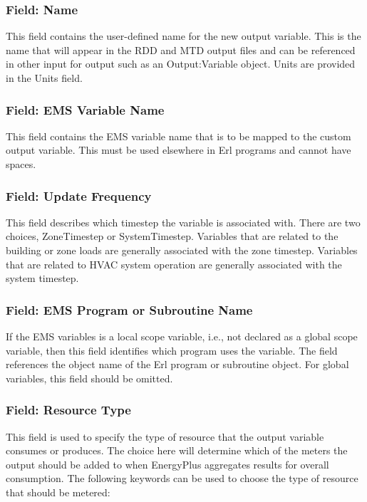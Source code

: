 \subsubsection{Field: Name}\label{field-name-6-006}

This field contains the user-defined name for the new output variable. This is the name that will appear in the RDD and MTD output files and can be referenced in other input for output such as an Output:Variable object. Units are provided in the Units field.

\subsubsection{Field: EMS Variable Name}\label{field-ems-variable-name-1}

This field contains the EMS variable name that is to be mapped to the custom output variable. This must be used elsewhere in Erl programs and cannot have spaces.

\subsubsection{Field: Update Frequency}\label{field-update-frequency-1}

This field describes which timestep the variable is associated with. There are two choices, ZoneTimestep or SystemTimestep. Variables that are related to the building or zone loads are generally associated with the zone timestep. Variables that are related to HVAC system operation are generally associated with the system timestep.

\subsubsection{Field: EMS Program or Subroutine Name}\label{field-ems-program-or-subroutine-name-1}

If the EMS variables is a local scope variable, i.e., not declared as a global scope variable, then this field identifies which program uses the variable. The field references the object name of the Erl program or subroutine object. For global variables, this field should be omitted.

\subsubsection{Field: Resource Type}\label{field-resource-type}

This field is used to specify the type of resource that the output variable consumes or produces. The choice here will determine which of the meters the output should be added to when EnergyPlus aggregates results for overall consumption. The following keywords can be used to choose the type of resource that should be metered:

